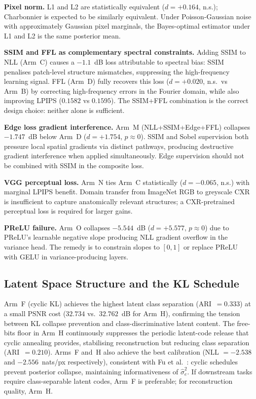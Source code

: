 \documentclass[12pt, a4paper, twoside, openright]{book}
\begin{document}
\textbf{Pixel norm.} L1 and L2 are statistically equivalent ($d=+0.164$, n.s.); Charbonnier is expected to be similarly equivalent. Under Poisson-Gaussian noise with approximately Gaussian pixel marginals, the Bayes-optimal estimator under L1 and L2 is the same posterior mean.

\textbf{SSIM and FFL as complementary spectral constraints.} Adding SSIM to NLL (Arm~C) causes a $-1.1$~dB loss attributable to spectral bias: SSIM penalises patch-level structure mismatches, suppressing the high-frequency learning signal. FFL (Arm~D) fully recovers this loss ($d=+0.020$, n.s.\ vs Arm~B) by correcting high-frequency errors in the Fourier domain, while also improving LPIPS ($0.1582$ vs $0.1595$). The SSIM+FFL combination is the correct design choice: neither alone is sufficient.

\textbf{Edge loss gradient interference.} Arm~M (NLL+SSIM+Edge+FFL) collapses $-1.747$~dB below Arm~D ($d=+1.754$, $p\approx 0$). SSIM and Sobel supervision both pressure local spatial gradients via distinct pathways, producing destructive gradient interference when applied simultaneously. Edge supervision should not be combined with SSIM in the composite loss.

\textbf{VGG perceptual loss.} Arm~N ties Arm~C statistically ($d=-0.065$, n.s.) with marginal LPIPS benefit. Domain transfer from ImageNet RGB to greyscale CXR is insufficient to capture anatomically relevant structures; a CXR-pretrained perceptual loss is required for larger gains.

\textbf{PReLU failure.} Arm~O collapses $-5.544$~dB ($d=+5.577$, $p\approx 0$) due to PReLU's learnable negative slope producing NLL gradient overflow in the variance head. The remedy is to constrain slopes to $[0,1]$ or replace PReLU with GELU in variance-producing layers.

\subsection{Latent Space Structure and the KL Schedule}
\label{sec:disc:findings:latent}

Arm~F (cyclic KL) achieves the highest latent class separation (ARI~$=0.333$) at a small PSNR cost ($32.734$ vs.\ $32.762$~dB for Arm~H), confirming the tension between KL collapse prevention and class-discriminative latent content. The free-bits floor in Arm~H continuously suppresses the periodic latent-code release that cyclic annealing provides, stabilising reconstruction but reducing class separation (ARI~$=0.210$). Arms~F and~H also achieve the best calibration (NLL $= -2.538$ and $-2.556$~nats/px respectively), consistent with Fu et al.\ \cite{fu_cyclical_2019}: cyclic schedules prevent posterior collapse, maintaining informativeness of $\hat{\sigma}^2_e$. If downstream tasks require class-separable latent codes, Arm~F is preferable; for reconstruction quality, Arm~H.
\end{document}
